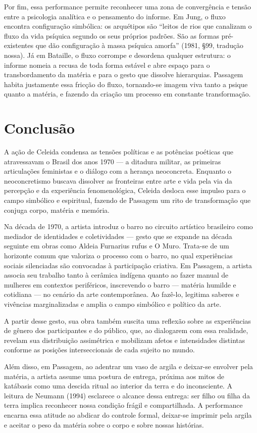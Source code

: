 Por fim, essa performance permite reconhecer uma zona de convergência e tensão entre a psicologia analítica e o pensamento do informe. Em Jung, o fluxo encontra configuração simbólica: os arquétipos são “leitos de rios que canalizam o fluxo da vida psíquica segundo os seus próprios padrões. São as formas pré-existentes que dão configuração à massa psíquica amorfa” (1981, §99, tradução nossa). Já em Bataille, o fluxo corrompe e desordena qualquer estrutura: o informe nomeia a recusa de toda forma estável e abre espaço para o transbordamento da matéria e para o gesto que dissolve hierarquias. Passagem habita justamente essa fricção do fluxo, tornando-se imagem viva tanto a psique quanto a matéria, e fazendo da criação um processo em constante transformação.

\section*{Conclusão}
A ação de Celeida condensa as tensões políticas e as potências poéticas que atravessavam o Brasil dos anos 1970 — a ditadura militar, as primeiras articulações feministas e o diálogo com a herança neoconcreta. Enquanto o neoconcretismo buscava dissolver as fronteiras entre arte e vida pela via da percepção e da experiência fenomenológica, Celeida desloca esse impulso para o campo simbólico e espiritual, fazendo de Passagem um rito de transformação que conjuga corpo, matéria e memória.

Na década de 1970, a artista introduz o barro no circuito artístico brasileiro como mediador de identidades e coletividades — gesto que se expande na década seguinte em obras como Aldeia Furnarius rufus e O Muro. Trata-se de um horizonte comum que valoriza o processo com o barro, no qual experiências sociais silenciadas são convocadas à participação criativa. Em Passagem, a artista associa seu trabalho tanto à cerâmica indígena quanto ao fazer manual de mulheres em contextos periféricos, inscrevendo o barro — matéria humilde e cotidiana — no cenário da arte contemporânea. Ao fazê-lo, legitima saberes e vivências marginalizadas e amplia o campo simbólico e político da arte.

A partir desse gesto, sua obra também suscita uma reflexão sobre as experiências de gênero dos participantes e do público, que, ao dialogarem com essa realidade, revelam sua distribuição assimétrica e mobilizam afetos e intensidades distintas conforme as posições interseccionais de cada sujeito no mundo.

Além disso, em Passagem, ao adentrar um vaso de argila e deixar-se envolver pela matéria, a artista assume uma postura de entrega, próxima aos mitos de katábasis como uma descida ritual ao interior da terra e do inconsciente. A leitura de Neumann (1994) esclarece o alcance dessa entrega: ser filho ou filha da terra implica reconhecer nossa condição frágil e compartilhada. A performance encarna essa atitude ao abdicar do controle formal, deixar-se imprimir pela argila e aceitar o peso da matéria sobre o corpo e sobre nossas histórias.

